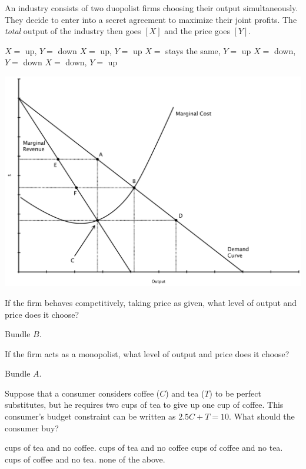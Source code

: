 \documentclass[12pt,addpoints]{exam}
\begin{document}
\begin{questions}
\myquestion[5] An industry consists of two duopolist firms choosing their output
simultaneously.  They decide to enter into a secret agreement to maximize their
joint profits.  The {\em total} output of the industry then goes $[X]$ and the
price goes $[Y]$.
	\begin{choices}
	\choice $X =$ up, $Y =$ down
	\choice $X =$ up, $Y =$ up
	\choice $X =$ stays the same, $Y =$ up
	\choice $X =$ down, $Y =$ down
	\CorrectChoice $X =$ down, $Y =$ up
	\end{choices}


\begin{center}
\includegraphics[scale=.43]{fig1.pdf}
\end{center}

\myquestion[5] If the firm behaves competitively, taking price as given, what
level of output and price does it choose?
	\answerline

	\begin{solution}
	Bundle $B$.
	\end{solution}

\myquestion[5] If the firm acts as a monopolist, what level of output and price
does it choose?
	\answerline 

	\begin{solution}
	Bundle $A$.
	\end{solution}

\myquestion[5] Suppose that a consumer considers coffee ($C$) and tea ($T$) to be perfect substitutes, but he
requires two cups of tea to give up one cup of coffee. This consumer's budget constraint
can be written as $2.5C + T = 10$. What should the consumer buy?
	\begin{choices}
	 cups of tea and no coffee.
	 cups of tea and no coffee
	 cups of coffee and no tea.
	 cups of coffee and no tea.
	\choice none of the above.
	\end{choices}


\end{questions}
\end{document}
